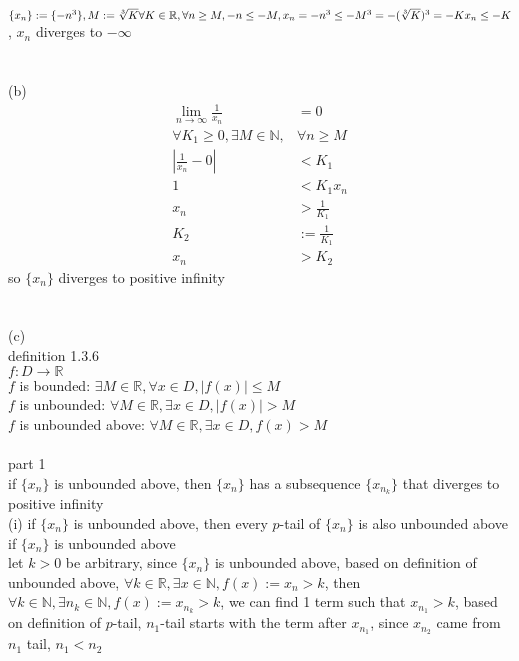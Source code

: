 \documentclass[12pt, border = 4pt, multi]{article} %
\begin{document}
$\{x_n\} := \{-n ^ 3\}, M := \sqrt[3]{K}\\
\forall K \in \mathbb{R}, \forall n \geq M, -n \leq -M, x_n = -n ^ 3 \leq -M ^ 3 = -(\sqrt[3]{K}) ^ 3 = -K\\
x_n \leq -K$, $x_n$ diverges to $-\infty$\\
\\
\\
(b)\\
\begin{align*}
\lim_{n \rightarrow \infty} \frac{1}{x_n} &= 0\\
\forall K_1 \geq 0, \exists M \in \mathbb{N}, &\forall n \geq M\\
\left|\frac{1}{x_n} - 0\right| &< K_1\\
1 &< K_1 x_n\\
x_n &> \frac{1}{K_1}\\
K_2 &:= \frac{1}{K_1}\\
x_n &> K_2
\end{align*}
so $\{x_n\}$ diverges to positive infinity\\
\\
\\
(c)\\
definition 1.3.6\\
$f: D \rightarrow \mathbb{R}$\\
$f$ is bounded: $\exists M \in \mathbb{R}, \forall x \in D, |f(x)| \leq M$\\
$f$ is unbounded: $\forall M \in \mathbb{R}, \exists x \in D, |f(x)| > M$\\
$f$ is unbounded above: $\forall M \in \mathbb{R}, \exists x \in D, f(x) > M$\\
\\
part 1\\
if $\{x_n\}$ is unbounded above, then $\{x_n\}$ has a subsequence $\{x_{n_k}\}$ that diverges to positive infinity\\
(i) if $\{x_n\}$ is unbounded above, then every $p$-tail of $\{x_n\}$ is also unbounded above\\
if $\{x_n\}$ is unbounded above\\
let $k > 0$ be arbitrary, since $\{x_n\}$ is unbounded above, based on definition of unbounded above, $\forall k \in \mathbb{R}, \exists x \in \mathbb{N}, f(x) := x_n > k$, then $\forall k \in \mathbb{N}, \exists n_k \in \mathbb{N}, f(x) := x_{n_k} > k$, we can find 1 term such that $x_{n_1} > k$, based on definition of $p$-tail, $n_1$-tail starts with the term after $x_{n_1}$, since $x_{n_2}$ came from $n_1$ tail, $n_1 < n_2$\\
\end{document}
